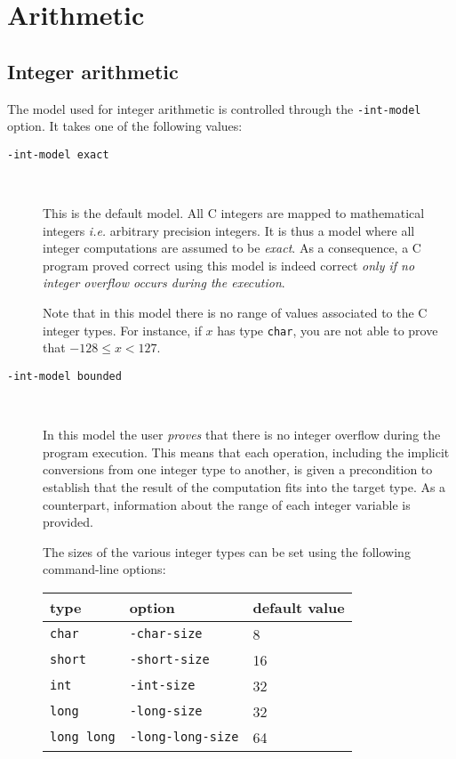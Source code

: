 \documentclass[12pt,a4paper,twoside,openright]{report}
\begin{document}
\section{Arithmetic}
\label{arithmetic}

\subsection{Integer arithmetic}
\label{arithmetic:int}

The model used for integer arithmetic is controlled through the
\texttt{-int-model} option. It takes one of the following values:

\begin{description}
\item[\texttt{-int-model exact}] ~\par
  This is the default model.
  All C integers are mapped to mathematical integers \emph{i.e.}
  arbitrary precision integers. It is thus a model where 
  all integer computations are assumed to be \emph{exact}. 
  As a consequence, a C program proved
  correct using this model is indeed correct  \emph{only if no
  integer overflow occurs during the execution}.

  Note that in this model there is no range of values associated to
  the C integer types. For instance, if $x$ has type
  \texttt{char}, you are not able to prove that $-128\le x < 127$.

\item[\texttt{-int-model bounded}] ~\par
  In this model the user \emph{proves} that there is
  no integer overflow during the program execution. 
  This means that each operation, including the implicit conversions
  from one integer type to another, is given a precondition to
  establish that the result of the computation fits into the target
  type. As a counterpart, information about the range of each integer
  variable is provided.

  The sizes of the various integer types can be set using the
  following command-line options:
\begin{center}
  \begin{tabular}{|l|l|l|}
    \hline
    type & option & default value \\\hline
    \texttt{char} & \texttt{-char-size} & 8 \\\hline
    \texttt{short} & \texttt{-short-size} & 16 \\\hline
    \texttt{int} & \texttt{-int-size} & 32 \\\hline
    \texttt{long} & \texttt{-long-size} & 32 \\\hline
    \texttt{long long} & \texttt{-long-long-size} & 64 \\\hline
  \end{tabular}
\end{center}


\end{description}
\end{document}
